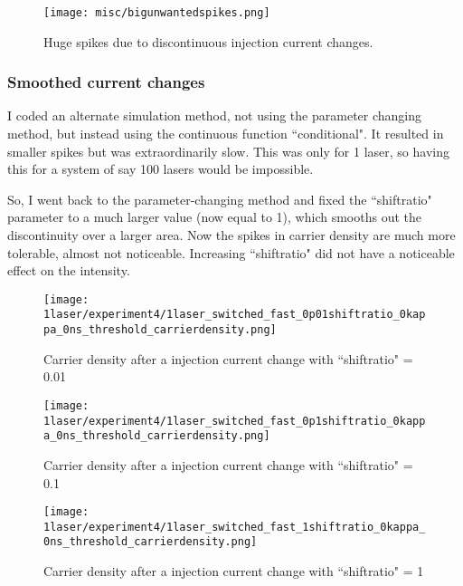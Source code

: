 \documentclass[11pt,letterpaper]{article}
\begin{document}
\begin{figure}[H]
\centering
\texttt{[image: misc/bigunwantedspikes.png]}
\caption{Huge spikes due to discontinuous injection current changes.\label{bigunwantedspikes}}
\end{figure}

\subsubsection{Smoothed current changes}
I coded an alternate simulation method, not using the parameter changing method, but instead using the continuous function ``conditional". It resulted in smaller spikes but was extraordinarily slow. This was only for 1 laser, so having this for a system of say 100 lasers would be impossible.

So, I went back to the parameter-changing method and fixed the ``shift\textunderscore ratio" parameter to a much larger value (now equal to 1), which smooths out the discontinuity over a larger area. Now the spikes in carrier density are much more tolerable, almost not noticeable. Increasing ``shift\textunderscore ratio" did not have a noticeable effect on the intensity.

\begin{figure}[H]
\centering
\texttt{[image: 1laser/experiment4/1laser\_switched\_fast\_0p01shiftratio\_0kappa\_0ns\_threshold\_carrierdensity.png]}
\caption{Carrier density after a injection current change with ``shift\textunderscore ratio" = 0.01}
\end{figure}

\begin{figure}[H]
\centering
\texttt{[image: 1laser/experiment4/1laser\_switched\_fast\_0p1shiftratio\_0kappa\_0ns\_threshold\_carrierdensity.png]}
\caption{Carrier density after a injection current change with ``shift\textunderscore ratio" = 0.1}
\end{figure}

\begin{figure}[H]
\centering
\texttt{[image: 1laser/experiment4/1laser\_switched\_fast\_1shiftratio\_0kappa\_0ns\_threshold\_carrierdensity.png]}
\caption{Carrier density after a injection current change with ``shift\textunderscore ratio" = 1}
\end{figure}

 
\end{document}
